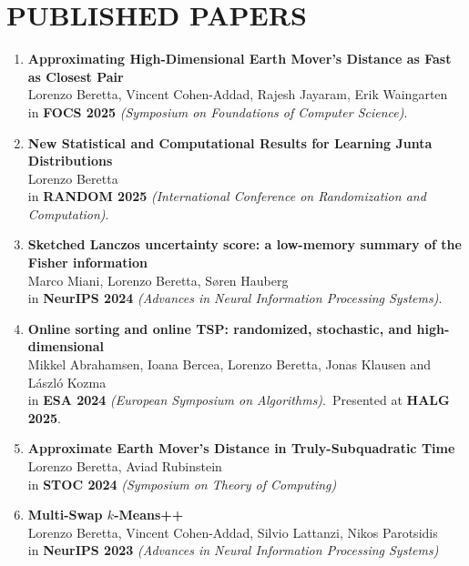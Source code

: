 \documentclass[paper=a4,fontsize=10pt]{scrartcl} %
\newcommand{\NewPart}[1]{\section*{\uppercase{#1}}}
\begin{document}
\NewPart{Published Papers}
\begingroup
\renewcommand{\section}[2]{}
% 
% 
\begin{enumerate}
    \item \textbf{Approximating High-Dimensional Earth Mover's Distance as Fast as Closest Pair}\\ 
  Lorenzo Beretta, Vincent Cohen-Addad, Rajesh Jayaram, Erik Waingarten \\
    in \textbf{FOCS 2025} \textit{(Symposium on Foundations of Computer Science)}.
    
    \item \textbf{New Statistical and Computational Results for Learning Junta Distributions}\\ 
  Lorenzo Beretta \\
    in \textbf{RANDOM 2025} \textit{(International Conference on Randomization and Computation)}.
    
    \item \textbf{Sketched Lanczos uncertainty score: a low-memory summary of the Fisher information}\\ 
  Marco Miani, Lorenzo Beretta, Søren Hauberg \\
    in \textbf{NeurIPS 2024} \textit{(Advances in Neural Information Processing Systems)}.

    \item \textbf{Online sorting and online TSP: randomized, stochastic, and high-dimensional}\\ 
    Mikkel Abrahamsen, Ioana Bercea, Lorenzo Beretta, Jonas Klausen and László Kozma \\
    in \textbf{ESA 2024} \textit{(European Symposium on Algorithms)}.\
    Presented at \textbf{HALG 2025}.
    
    \item \textbf{Approximate Earth Mover's Distance in Truly-Subquadratic Time} \\ 
    Lorenzo Beretta, Aviad Rubinstein \\
    in \textbf{STOC 2024} \textit{(Symposium on Theory of Computing)}
    
    \item \textbf{Multi-Swap $k$-Means++} \\
    Lorenzo Beretta, Vincent Cohen-Addad, Silvio Lattanzi, Nikos Parotsidis \\
    in \textbf{NeurIPS 2023} \textit{(Advances in Neural Information Processing Systems)}
    

\end{enumerate}
\end{document}
